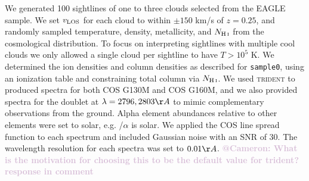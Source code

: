 \documentclass[fleqn,usenatbib]{mnras}
\makeatletter
\newcommand{\atcameron}[1]{\textcolor{Thistle}{\textbf{@Cameron: #1}}}
\makeatother
\begin{document}


We generated 100 sightlines of one to three clouds selected from the EAGLE sample.
We set $v_{\rm LOS}$ for each cloud to within $\pm150$ km/s of $z=0.25$, and randomly sampled temperature, density, metallicity, and $N_{\ion{H}{I}}$ from the cosmological distribution.
To focus on interpreting sightlines with multiple cool clouds we only allowed a single cloud per sightline to have $T>10^5$ K.
We determined the ion densities and column densities as described for \texttt{sample0}, using an ionization table and constraining total column via $N_{\ion{H}{I}}$.
We used \textsc{trident} to produced spectra for both COS G130M and COS G160M, and we also provided spectra for the  doublet at $\lambda = 2796, 2803 \AA$ to mimic complementary observations from the ground.
Alpha element abundances relative to other elements were set to solar, e.g. /$\alpha$ is solar.
We applied the COS line spread function to each spectrum and included Gaussian noise with an SNR of 30.
The wavelength resolution for each spectra was set to $0.01 \AA$.
\atcameron{What is the motivation for choosing this to be the default value for trident? response in comment}
\end{document}
